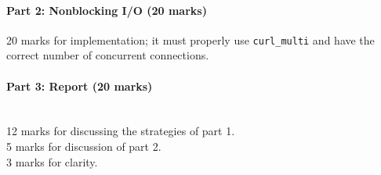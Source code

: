 \documentclass[letterpaper,10pt]{article}
\begin{document}
\paragraph{Part 2: Nonblocking I/O (20 marks)}
20 marks for implementation; it must properly use \texttt{curl\_multi} and 
have the correct number of concurrent connections.

\paragraph{Part 3: Report (20 marks)}~\\
12 marks for discussing the strategies of part 1.\\
5 marks for discussion of part 2.\\
3 marks for clarity.
\end{document}
